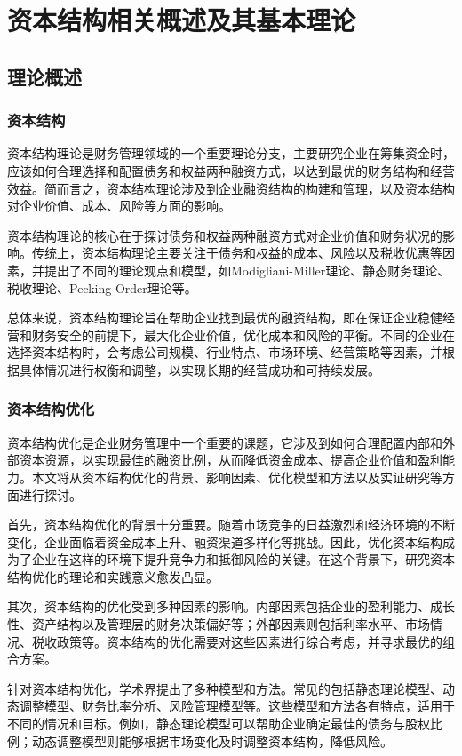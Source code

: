 \chapter{资本结构相关概述及其基本理论}
\section{理论概述}
\subsection{资本结构}
资本结构理论是财务管理领域的一个重要理论分支，主要研究企业在筹集资金时，应该如何合理选择和配置债务和权益两种融资方式，以达到最优的财务结构和经营效益。简而言之，资本结构理论涉及到企业融资结构的构建和管理，以及资本结构对企业价值、成本、风险等方面的影响。

资本结构理论的核心在于探讨债务和权益两种融资方式对企业价值和财务状况的影响。传统上，资本结构理论主要关注于债务和权益的成本、风险以及税收优惠等因素，并提出了不同的理论观点和模型，如Modigliani-Miller理论、静态财务理论、税收理论、Pecking Order理论等。

总体来说，资本结构理论旨在帮助企业找到最优的融资结构，即在保证企业稳健经营和财务安全的前提下，最大化企业价值，优化成本和风险的平衡。不同的企业在选择资本结构时，会考虑公司规模、行业特点、市场环境、经营策略等因素，并根据具体情况进行权衡和调整，以实现长期的经营成功和可持续发展。
\subsection{资本结构优化}
资本结构优化是企业财务管理中一个重要的课题，它涉及到如何合理配置内部和外部资本资源，以实现最佳的融资比例，从而降低资金成本、提高企业价值和盈利能力。本文将从资本结构优化的背景、影响因素、优化模型和方法以及实证研究等方面进行探讨。

首先，资本结构优化的背景十分重要。随着市场竞争的日益激烈和经济环境的不断变化，企业面临着资金成本上升、融资渠道多样化等挑战。因此，优化资本结构成为了企业在这样的环境下提升竞争力和抵御风险的关键。在这个背景下，研究资本结构优化的理论和实践意义愈发凸显。

其次，资本结构的优化受到多种因素的影响。内部因素包括企业的盈利能力、成长性、资产结构以及管理层的财务决策偏好等；外部因素则包括利率水平、市场情况、税收政策等。资本结构的优化需要对这些因素进行综合考虑，并寻求最优的组合方案。

针对资本结构优化，学术界提出了多种模型和方法。常见的包括静态理论模型、动态调整模型、财务比率分析、风险管理模型等。这些模型和方法各有特点，适用于不同的情况和目标。例如，静态理论模型可以帮助企业确定最佳的债务与股权比例；动态调整模型则能够根据市场变化及时调整资本结构，降低风险。

